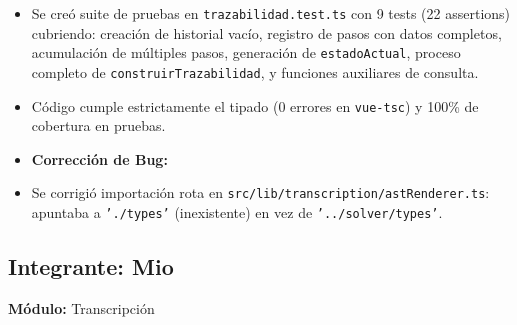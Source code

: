 \documentclass[11pt,a4paper,openany]{book}
\begin{document}
\begin{itemize}[leftmargin=*]
\item Se creó suite de pruebas en \texttt{trazabilidad.test.ts} con 9 tests (22 assertions) cubriendo: creación de historial vacío, registro de pasos con datos completos, acumulación de múltiples pasos, generación de \texttt{estadoActual}, proceso completo de \texttt{construirTrazabilidad}, y funciones auxiliares de consulta.
\item Código cumple estrictamente el tipado (0 errores en \texttt{vue-tsc}) y 100\% de cobertura en pruebas.
\item \textbf{Corrección de Bug:}
\item Se corrigió importación rota en \texttt{src/lib/transcription/astRenderer.ts}: apuntaba a \texttt{'./types'} (inexistente) en vez de \texttt{'../solver/types'}.
\end{itemize}

\subsection{Integrante: Mio}
\textbf{Módulo:} Transcripción
\end{document}
